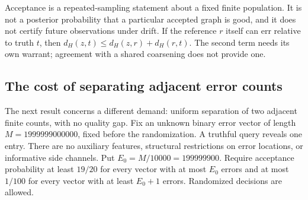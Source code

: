 Acceptance is a repeated-sampling statement about a fixed finite population. It is not a posterior probability that a particular accepted graph is good, and it does not certify future observations under drift. If the reference $r$ itself can err relative to truth $t$, then
$d_H(z,t)\le d_H(z,r)+d_H(r,t)$.
The second term needs its own warrant; agreement with a shared coarsening does not provide one.

\subsection{The cost of separating adjacent error counts}
\label{sam:adjacent}
The next result concerns a different demand: uniform separation of two adjacent finite counts, with no quality gap. Fix an unknown binary error vector of length $M=1999999000000$, fixed before the randomization. A truthful query reveals one entry. There are no auxiliary features, structural restrictions on error locations, or informative side channels. Put $E_0=M/10000=199999900$. Require acceptance probability at least $19/20$ for every vector with at most $E_0$ errors and at most $1/100$ for every vector with at least $E_0+1$ errors. Randomized decisions are allowed.

